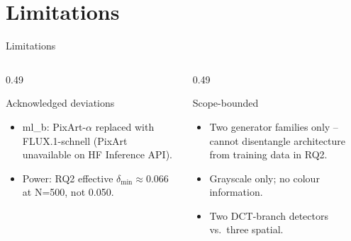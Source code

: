 \documentclass[aspectratio=169,11pt]{beamer}
\begin{document}
\section{Limitations}
\begin{frame}{Limitations}
\small
\begin{columns}[T]
\begin{column}{0.49\textwidth}
\begin{block}{Acknowledged deviations}
\begin{itemize}
\item ml\_b: PixArt-$\alpha$ replaced with FLUX.1-schnell (PixArt unavailable on HF Inference API).
\item Power: RQ2 effective $\delta_\text{min} \approx 0.066$ at N=500, not 0.050.
\end{itemize}
\end{block}
\end{column}
\begin{column}{0.49\textwidth}
\begin{block}{Scope-bounded}
\begin{itemize}
\item Two generator families only -- cannot disentangle architecture from training data in RQ2.
\item Grayscale only; no colour information.
\item Two DCT-branch detectors vs.\ three spatial.
\end{itemize}
\end{block}
\end{column}
\end{columns}
\end{frame}

\end{document}
